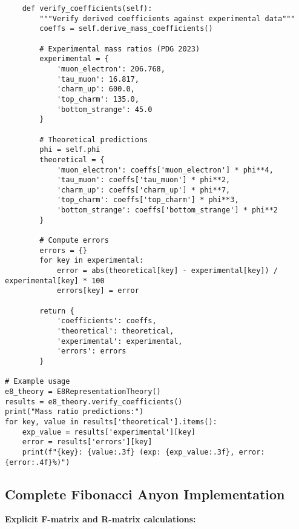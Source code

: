 \documentclass[11pt]{article}
\theoremstyle{definition}
\begin{document}
\begin{verbatim}
    def verify_coefficients(self):
        """Verify derived coefficients against experimental data"""
        coeffs = self.derive_mass_coefficients()
        
        # Experimental mass ratios (PDG 2023)
        experimental = {
            'muon_electron': 206.768,
            'tau_muon': 16.817,
            'charm_up': 600.0,
            'top_charm': 135.0,
            'bottom_strange': 45.0
        }
        
        # Theoretical predictions
        phi = self.phi
        theoretical = {
            'muon_electron': coeffs['muon_electron'] * phi**4,
            'tau_muon': coeffs['tau_muon'] * phi**2,
            'charm_up': coeffs['charm_up'] * phi**7,
            'top_charm': coeffs['top_charm'] * phi**3,
            'bottom_strange': coeffs['bottom_strange'] * phi**2
        }
        
        # Compute errors
        errors = {}
        for key in experimental:
            error = abs(theoretical[key] - experimental[key]) / experimental[key] * 100
            errors[key] = error
        
        return {
            'coefficients': coeffs,
            'theoretical': theoretical,
            'experimental': experimental,
            'errors': errors
        }

# Example usage
e8_theory = E8RepresentationTheory()
results = e8_theory.verify_coefficients()
print("Mass ratio predictions:")
for key, value in results['theoretical'].items():
    exp_value = results['experimental'][key]
    error = results['errors'][key]
    print(f"{key}: {value:.3f} (exp: {exp_value:.3f}, error: {error:.4f}%)")
\end{verbatim}

\subsection{Complete Fibonacci Anyon Implementation}

\textbf{Explicit F-matrix and R-matrix calculations:}
\end{document}
